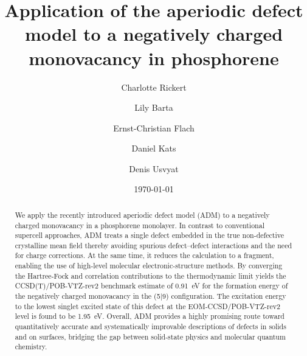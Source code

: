 \documentclass[aip,jcp,reprint]{revtex4-2}
\begin{document}
\title{Application of the aperiodic defect model to a negatively charged monovacancy in phosphorene}

 \author{Charlotte Rickert}

 \author{Lily Barta}

 
 \author{Ernst-Christian Flach}

 
\author{Daniel Kats}%
%

 
 \author{Denis Usvyat}

 

\date{\today}


\begin{abstract}
 We apply the recently introduced aperiodic defect model (ADM) to a negatively charged monovacancy in a phosphorene monolayer.  In contrast to conventional supercell approaches, ADM treats a single defect embedded in the true non-defective crystalline mean field thereby avoiding spurious defect–defect interactions and the need for charge corrections. At the same time, it reduces the calculation to a fragment, enabling the use of high-level molecular electronic-structure methods. By converging the Hartree-Fock and correlation contributions to the thermodynamic limit yields the CCSD(T)/POB-VTZ-rev2 benchmark estimate of 0.91~eV for the formation energy of the negatively charged monovacancy in the (5$|$9) configuration. The excitation energy to the lowest singlet excited state of this defect at the EOM-CCSD/POB-VTZ-rev2 level is found to be 1.95~eV. Overall, ADM provides a highly promising route toward quantitatively accurate and systematically improvable descriptions of defects in solids and on surfaces, bridging the gap between solid-state physics and molecular quantum chemistry. 
\end{abstract}
  
 

\maketitle
\end{document}

